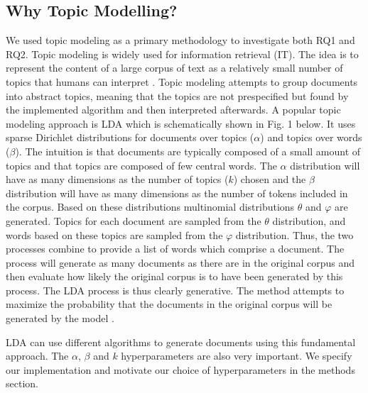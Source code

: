 \documentclass{article}
\begin{document}
    \subsection{Why Topic Modelling?}
    We used topic modeling as a primary methodology to investigate both RQ1 and RQ2. Topic modeling is widely used for information retrieval (IT). The idea is to represent the content of a large corpus of text as a relatively small number of topics that humans can interpret \cite{arun2010finding}. Topic modeling attempts to group documents into abstract topics, meaning that the topics are not prespecified but found by the implemented algorithm and then interpreted afterwards. 
A popular topic modeling approach is LDA \cite{arun2010finding,cao2009density} which is schematically shown in Fig. 
1 below. It uses sparse Dirichlet distributions for documents over topics ($\alpha$) and topics over words ($\beta$). The intuition is that documents are typically composed of a small amount of topics and that topics are composed of few central words. The $\alpha$ distribution will have as many dimensions as the number of topics ($k$) chosen and the $\beta$ distribution will have as many dimensions as the number of tokens included in the corpus. Based on these distributions multinomial distributions $\theta$ and $\varphi$ are generated. Topics for each document are sampled from the $\theta$ distribution, and words based on these topics are sampled from the $\varphi$ distribution. Thus, the two processes combine to provide a list of words which comprise a document. The process will generate as many documents as there are in the original corpus and then evaluate how likely the original corpus is to have been generated by this process. The LDA process is thus clearly generative. The method attempts to maximize the probability that the documents in the original corpus will be generated by the model \cite{cao2009density}.

LDA can use different algorithms to generate documents using this fundamental approach. The $\alpha$, $\beta$ and $k$ hyperparameters are also very important. We specify our implementation and motivate our choice of hyperparameters in the methods section. 
\end{document}
